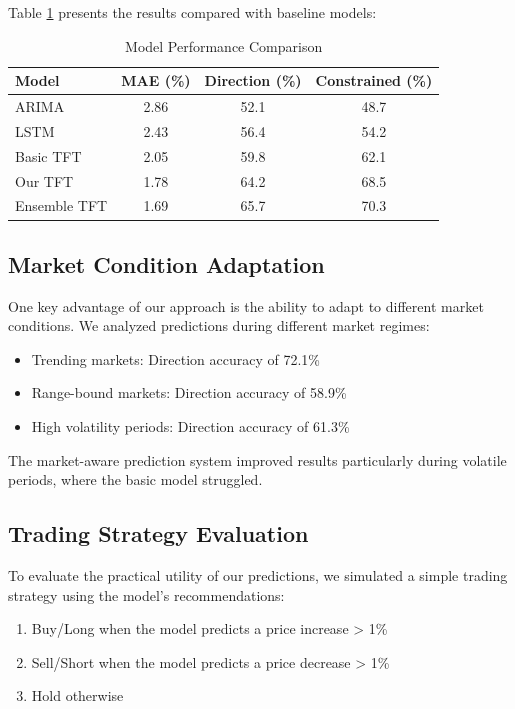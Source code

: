 \documentclass[conference]{IEEEtran}
\begin{document}
Table \ref{tab:performance} presents the results compared with baseline models:

\begin{table}[h]
\caption{Model Performance Comparison}
\centering
\begin{tabular}{lccc}
\toprule
\textbf{Model} & \textbf{MAE (\%)} & \textbf{Direction (\%)} & \textbf{Constrained (\%)} \\
\midrule
ARIMA & 2.86 & 52.1 & 48.7 \\
LSTM & 2.43 & 56.4 & 54.2 \\
Basic TFT & 2.05 & 59.8 & 62.1 \\
Our TFT & 1.78 & 64.2 & 68.5 \\
Ensemble TFT & 1.69 & 65.7 & 70.3 \\
\bottomrule
\end{tabular}
\label{tab:performance}
\end{table}

\subsection{Market Condition Adaptation}
One key advantage of our approach is the ability to adapt to different market conditions. We analyzed predictions during different market regimes:

\begin{itemize}
\item Trending markets: Direction accuracy of 72.1\%
\item Range-bound markets: Direction accuracy of 58.9\%
\item High volatility periods: Direction accuracy of 61.3\%
\end{itemize}

The market-aware prediction system improved results particularly during volatile periods, where the basic model struggled.

\subsection{Trading Strategy Evaluation}
To evaluate the practical utility of our predictions, we simulated a simple trading strategy using the model's recommendations:

\begin{enumerate}
\item Buy/Long when the model predicts a price increase > 1\%
\item Sell/Short when the model predicts a price decrease > 1\%
\item Hold otherwise
\end{enumerate}
\end{document}
